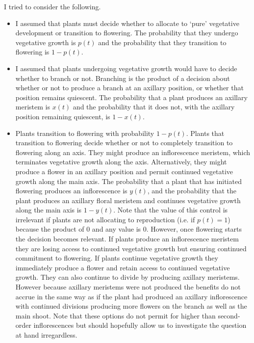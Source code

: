 \documentclass[12pt, oneside]{article}   	%
\begin{document}
I tried to consider the following. 
%
\begin{itemize}
  \item I assumed that plants must decide whether to allocate to `pure' vegetative development or transition to flowering. The probability that they undergo vegetative growth is $p(t)$ and the probability that they transition to flowering is $1-p(t)$. 
  \item I assumed that plants undergoing vegetative growth would have to decide whether to branch or not. Branching is the product of a decision about whether or not to produce a branch at an axillary position, or whether that position remains quiescent. The probability that a plant produces an axillary meristem is $x(t)$ and the probability that it does not, with the axillary position remaining quiescent, is $ 1 - x(t) $.
    \item Plants transition to flowering with probability $1-p(t)$. Plants that transition to flowering decide whether or not to completely transition to flowering along an axis. They might produce an inflorescence meristem, which terminates vegetative growth along the axis. Alternatively, they might produce a flower in an axillary position and permit continued vegetative growth along the main axis. The probability that a plant that has initiated flowering produces an inflorescence is $ y(t)$, and the probability that the plant produces an axillary floral meristem and continues vegetative growth along the main axis is $ 1 - y(t) $. Note that the value of this control is irrelevant if plants are not allocating to reproduction (i.e. if $p(t) = 1$) because the product of 0 and any value is 0. However, once flowering starts the decision becomes relevant. If plants produce an inflorescence meristem they are losing access to continued vegetative growth but ensuring continued commitment to flowering. If plants continue vegetative growth they immediately produce a flower and retain access to continued vegetative growth. They can also continue to divide by producing axillary meristems. However because axillary meristems were not produced the benefits do not accrue in the same way as if the plant had produced an axillary inflorescence with continued divisions producing more flowers on the branch as well as the main shoot. Note that these options do not permit for higher than second-order inflorescences but should hopefully allow us to investigate the question at hand irregardless.

\end{itemize}
\end{document}
